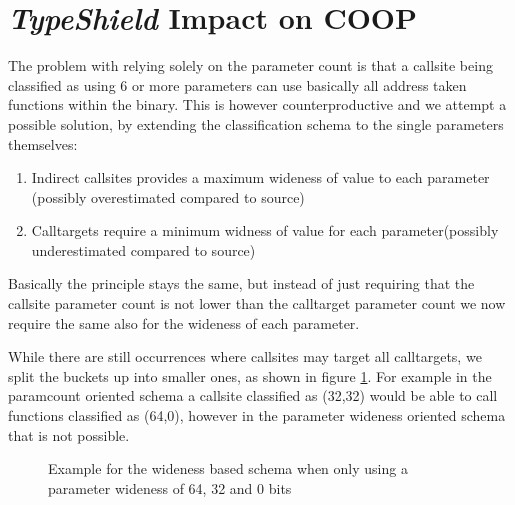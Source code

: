 \section{\textit{TypeShield} Impact on COOP}
\label{TypeShild Impact on COOP}
The problem with relying solely on the parameter count is that a callsite being classified as using 6 or more parameters can use basically all address taken functions within the binary. This is however counterproductive and we attempt a possible solution, by extending the classification schema to the single parameters themselves:

\begin{enumerate}
\item Indirect callsites provides a maximum wideness of value to each parameter (possibly overestimated compared to source)
\item Calltargets require a minimum widness of value for each parameter(possibly underestimated compared to source)
\end{enumerate}

Basically the principle stays the same, but instead of just requiring that the callsite parameter count is not lower than the calltarget parameter count we now require the same also for the wideness of each parameter.

While there are still occurrences where callsites may target all calltargets, we split the buckets up into smaller ones, as shown in figure \ref{fig:lattice3264}. For example in the paramcount oriented schema a callsite classified as (32,32) would be able to call functions classified as (64,0), however in the parameter wideness oriented schema that is not possible.

\begin{figure}[!h]
\centering
{}
\caption{Example for the wideness based schema when only using a parameter wideness of 64, 32 and 0 bits}
\label{fig:lattice3264}
\end{figure}